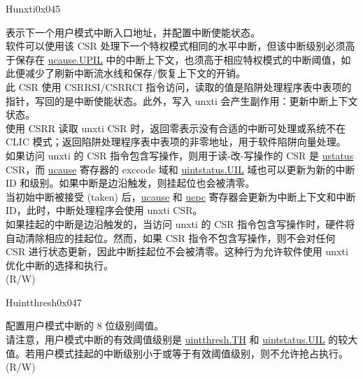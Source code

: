 \begin{register}{H}{unxti}{0x045}\label{regdesc:UNXTI_REG}
%
\regnewline%
\begin{regdesc}\begin{reglist}
\label{fielddesc:UNXTI}\item [UNXTI]
表示下一个用户模式中断入口地址，并配置中断使能状态。\\
软件可以使用该 CSR 处理下一个特权模式相同的水平中断，但该中断级别必须高于保存在 \hyperref[fielddesc:UCAUSE_UPIL]{{ucause.UPIL}} 中的中断上下文，也须高于相应特权模式的中断阈值，如此便减少了刷新中断流水线和保存/恢复上下文的开销。\\
此 CSR 使用 CSRRSI/CSRRCI 指令访问，读取的值是陷阱处理程序表中表项的指针，写回的是中断使能状态。此外，写入 unxti 会产生副作用：更新中断上下文状态。\\
使用 CSRR 读取 unxti CSR 时，返回零表示没有合适的中断可处理或系统不在 CLIC 模式；返回陷阱处理程序表中表项的非零地址，用于软件陷阱向量处理。\\
如果访问 unxti 的 CSR 指令包含写操作，则用于读-改-写操作的 CSR 是 \hyperref[regdesc:USTATUS]{ustatus} CSR，而 \hyperref[regdesc:UCAUSE]{ucause} 寄存器的 exccode 域和 \hyperref[fielddesc:UINTSTATUS_UIL]{uintstatus.UIL} 域也可以更新为新的中断 ID 和级别。如果中断是边沿触发，则挂起位也会被清零。\\
当初始中断被接受 (taken) 后，\hyperref[regdesc:UCAUSE]{ucause} 和 \hyperref[regdesc:UEPC]{uepc} 寄存器会更新为中断上下文和中断 ID，此时，中断处理程序会使用 unxti CSR。\\
如果挂起的中断是边沿触发的，当访问 unxti 的 CSR 指令包含写操作时，硬件将自动清除相应的挂起位。然而，如果 CSR 指令不包含写操作，则不会对任何 CSR 进行状态更新，因此中断挂起位不会被清零。这种行为允许软件使用 unxti 优化中断的选择和执行。\\
(R/W)
\end{reglist}\end{regdesc}
\end{register}

\begin{register}{H}{uintthresh}{0x047}\label{regdesc:UINTTHRESH}
%
%
\regnewline%
\begin{regdesc}\begin{reglist}
\label{fielddesc:UINTTHRESH_TH}\item [TH] 配置用户模式中断的 8 位级别阈值。\\
请注意，用户模式中断的有效阈值级别是 \hyperref[fielddesc:UINTTHRESH_TH]{{uintthresh.TH}} 和 \hyperref[fielddesc:UINTSTATUS_UIL]{{uintstatus.UIL}} 的较大值。若用户模式挂起的中断级别小于或等于有效阈值级别，则不允许抢占执行。\\
(R/W)
\end{reglist}\end{regdesc}
\end{register}

